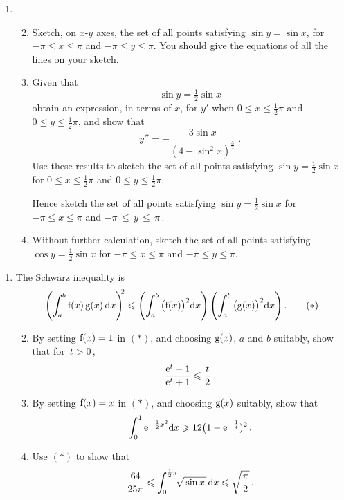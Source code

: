 \documentclass[a4, 11pt]{report}
\newlength{\qspace}
\newcounter{qnumber}
\newenvironment{question}%
 {\vspace{\qspace}
  \begin{enumerate}[\bfseries 1\quad][10]%
    \setcounter{enumi}{\value{qnumber}}%
    \item%
 }
{
  \end{enumerate}
  \filbreak
  \stepcounter{qnumber}
 }
\newenvironment{questionparts}[1][1]%
 {
  \begin{enumerate}[\bfseries (i)]%
    \setcounter{enumii}{#1}
    \addtocounter{enumii}{-1}
    \setlength{\itemsep}{2mm}
    \setlength{\parskip}{5pt}
 }
 {
  \end{enumerate}
 }
\def\d{{\rm d}}
\def\e{{\rm e}}
\def\g{{\rm g}}
\def\f{{\rm f}}
\def\le{\leqslant}
\def\ge{\geqslant}
\begin{document}
\begin{question}
\begin{questionparts}
\item Sketch, on $x$-$y$ axes, the set of all points satisfying
$\sin y = \sin x$, for $-\pi \le x \le \pi$ and  $-\pi \le y \le \pi$.
You should give the equations of all the lines on your sketch.

\item Given that
\[
\sin y = \tfrac12 \sin x
\]
obtain an expression, in terms of $x$,  for $y'$  when
$0\le x \le \frac12 \pi$
and $0\le y \le \frac12 \pi$,
and show that
\[
y'' = - \frac {3\sin x}{(4-\sin^2 x)^{\frac32}}
\;.
\]
Use these results to sketch the
set of all points satisfying $\sin y = \tfrac12 \sin x$ for
$0 \le x \le \frac12 \pi$ and
$0 \le y \le \frac12 \pi$.


Hence sketch the set of all points satisfying 
$\sin y = \tfrac12 \sin x$ for
$-\pi\! \le \! x \! \le \! \pi$ and
\mbox{$ -\pi \, \le\, y\, \le\, \pi\,$}.

\item
Without further calculation,
sketch the set of all points satisfying
 $\cos y = \tfrac12 \sin x$ for $- \pi \le x \le \pi$ and
$ -\pi \le y \le \pi$.
\end{questionparts}
\end{question}




\begin{question}
The Schwarz inequality
is
\[
\left( \int_a^b \f(x)\, \g(x)\,\d x\right)^{\!\!2}
\le 
\left(
\int_a^b \big( \f(x)\big)^2 \d x 
\right)
\left(
\int_a^b \big( \g(x)\big)^2 \d x 
\right)
.
\tag{$*$}
\]
\begin{questionparts}
\item
By setting $ \f(x)=1$ in $(*)$, and choosing
$\g(x)$, 
$a$ and $b$ suitably, show that for~$t>  0\,$,
\[
\frac {\e^t -1}{\e^t+1} \le \frac t 2
\,.
\]
\item
By setting $ \f(x)= x  $  
in $(*)$, 
and choosing $ \g(x)$ suitably,
show that
\[
\int_0^1\e^{-\frac12 x^2}\d x \ge 12 \big(1-\e^{-\frac14})^2
\,.
\]

\item
Use $(*)$  to show that 
\[
\frac {64}{25\pi} \le \int_0^{\frac12\pi} 
\!\!
{\textstyle \sqrt{\, \sin x\, } }
\, \d x 
\le \sqrt{\frac \pi 2 }
\,.
\]
\end{questionparts}

\end{question}
\end{document}
